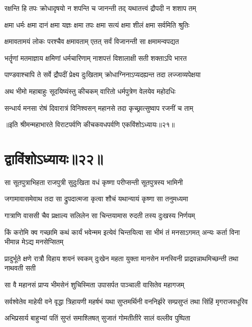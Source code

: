 \twolineshloka
{रक्षन्ति हि तपः क्रोधादृषयो न शपन्ति च}
{जानन्ती तद् यथातत्त्वं द्रौपदी न शशाप तम्}


\twolineshloka
{क्षमा धर्मः क्षमा दानं क्षमा यज्ञः क्षमा तपः}
{क्षमा सत्यं क्षमा शीलं क्षमा सर्वमिति श्रुतिः}


\twolineshloka
{क्षमावतामयं लोकः परश्चैव क्षमावताम्}
{एतत् सर्वं विजानन्ती सा क्षमामन्वपद्यत}


\twolineshloka
{भर्तॄणां मतमाज्ञाय क्षमिणां धर्मचारिणाम्}
{नाशपत्तं विशालाक्षी सती शक्ताऽपि भारत}


\twolineshloka
{पाण्डवाश्चापि ते सर्वे द्रौपदीं प्रेक्ष्य दुःखिताम्}
{क्रोधाग्निनाऽप्यदह्यन्त तदा लज्जाव्यपेक्षया}


\twolineshloka
{अथ भीमो महाबाहुः सूदयिष्यंस्तु कीचकम्}
{वारितो धर्मपुत्रेण वेलयेव महोदधिः}


\twolineshloka
{सन्धार्य मनसा रोषं दिवारात्रं विनिश्वसन्}
{महानसे तदा कृच्छ्रात्सुष्वाप रजनीं च ताम्}

॥इति श्रीमन्महाभारते विराटपर्वणि कीचकवधपर्वणि एकविंशोऽध्यायः॥२१॥

\chapter{द्वाविंशोऽध्यायः॥२२॥}

\twolineshloka
{सा सूतपुत्राभिहता राजपुत्री सुदुःखिता}
{वधं कृष्णा परीप्सन्ती सूतपुत्रस्य भामिनी}


\twolineshloka
{जगामावासमेवाथ तदा सा द्रुपदात्मजा}
{कृत्वा शौचं यथान्यायं कृष्णा सा तनुमध्यमा}


\twolineshloka
{गात्राणि वाससी चैव प्रक्षाल्य सलिलेन सा}
{चिन्तयामास रुदती तस्य दुःखस्य निर्णयम्}


\threelineshloka
{किं करोमि क्व गच्छामि कथं कार्यं भवेन्मम}
{इत्येवं चिन्तयित्वा सा भीमं तं मनसाऽगमत्}
{अन्यः कर्ता विना भीमान्न मेऽद्य मनसेप्सितम्}


\threelineshloka
{प्रादुर्भूते क्षणे रात्रौ विहाय शयनं स्वकम्}
{दुःखेन महता युक्ता मानसेन मनस्विनी}
{प्राद्रवन्नाथमिच्छन्ती तथा नाथवती सती}


\twolineshloka
{सा वै महानसं प्राप्य भीमसेनं शुचिस्मिता}
{उपासर्पत पाञ्चाली वासितेव महागजम्}


\threelineshloka
{सर्वश्वेतेव माहेयी वने वृद्धा त्रिहायणी}
{महर्षभं यथा सुप्तमर्थिनी वननिर्झरे}
{सम्प्रसुप्तं तथा सिंहिं मृगराजवधूरिव}


\twolineshloka
{अभिप्रसार्य बाहुभ्यां पतिं सुप्तं समाश्लिषत्}
{सुजातं गोमतीतीरे सालं वल्लीव पुष्पिता}


